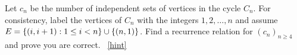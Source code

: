 \documentclass{book}
\begin{document}
\setcounter{project}{140}
\addtocounter{project}{-1}
\begin{activity}[]\label{activity-133}
\hypertarget{p-963}{}%
Let \(c_n\) be the number of independent sets of vertices in the cycle \(C_n\).  For consistency, label the vertices of \(C_n\) with the integers \(1, 2, \ldots, n\) and assume \(E = \{(i, i+1) : 1 \le i < n\} \cup \{(n, 1)\}\). Find a recurrence relation for \((c_n)_{n\ge 4}\) and prove you are correct.%
~\hfill{\tiny\hyperlink{a-140}{[hint]}\hypertarget{q-140}{}}\end{activity}
\end{document}
